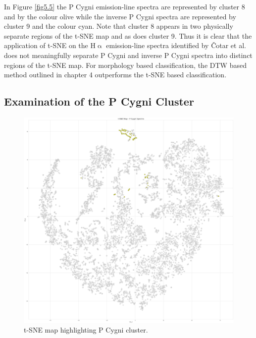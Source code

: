 In Figure \ref{fig5.5} the P Cygni emission-line spectra are represented by cluster 8 and by the colour olive while the inverse P Cygni spectra are represented by cluster 9 and the colour cyan. Note that cluster 8 appears in two physically separate regions of the t-SNE map and as does cluster 9. Thus it is clear that the application of t-SNE on the H$\upalpha$ emission-line spectra identified by Čotar et al. does not meaningfully separate P Cygni and inverse P Cygni spectra into distinct regions of the t-SNE map. For morphology based classification, the DTW based method outlined in chapter 4 outperforms the t-SNE based classification.

\subsection{Examination of the P Cygni Cluster}

\begin{figure}[!htb]
\centering
\includegraphics[scale=0.14]{figures/t-sne p cygni only.png}
\caption{t-SNE map highlighting P Cygni cluster.}
\end{figure}

